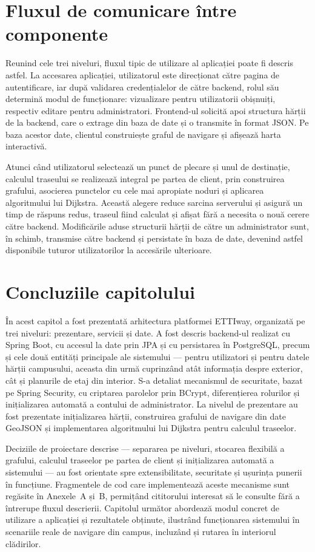 \section{Fluxul de comunicare între componente}
\label{sec:flux}

Reunind cele trei niveluri, fluxul tipic de utilizare al aplicației poate fi
descris astfel. La accesarea aplicației, utilizatorul este direcționat către
pagina de autentificare, iar după validarea credențialelor de către backend,
rolul său determină modul de funcționare: vizualizare pentru utilizatorii
obișnuiți, respectiv editare pentru administratori. Frontend-ul solicită apoi
structura hărții de la backend, care o extrage din baza de date și o
transmite în format JSON. Pe baza acestor date, clientul construiește graful
de navigare și afișează harta interactivă.

Atunci când utilizatorul selectează un punct de plecare și unul de
destinație, calculul traseului se realizează integral pe partea de client,
prin construirea grafului, asocierea punctelor cu cele mai apropiate noduri
și aplicarea algoritmului lui Dijkstra. Această alegere reduce sarcina
serverului și asigură un timp de răspuns redus, traseul fiind calculat și
afișat fără a necesita o nouă cerere către backend. Modificările aduse
structurii hărții de către un administrator sunt, în schimb, transmise către
backend și persistate în baza de date, devenind astfel disponibile tuturor
utilizatorilor la accesările ulterioare.

\section{Concluziile capitolului}
\label{sec:concluzii-cap2}

În acest capitol a fost prezentată arhitectura platformei ETTIway, organizată
pe trei niveluri: prezentare, servicii și date. A fost descris backend-ul
realizat cu Spring Boot, cu accesul la date prin JPA și cu persistarea în
PostgreSQL, precum și cele două entități principale ale sistemului — pentru
utilizatori și pentru datele hărții campusului, aceasta din urmă cuprinzând
atât informația despre exterior, cât și planurile de etaj din interior. S-a detaliat mecanismul de securitate, bazat pe Spring Security, cu
criptarea parolelor prin BCrypt, diferențierea rolurilor și inițializarea
automată a contului de administrator. La nivelul de prezentare au fost
prezentate inițializarea hărții, construirea grafului de navigare din date
GeoJSON și implementarea algoritmului lui Dijkstra pentru calculul traseelor.

Deciziile de proiectare descrise — separarea pe niveluri, stocarea flexibilă
a grafului, calculul traseelor pe partea de client și inițializarea automată
a sistemului — au fost orientate spre extensibilitate, securitate și ușurința
punerii în funcțiune. Fragmentele de cod care implementează aceste mecanisme
sunt regăsite în Anexele~A și~B, permițând cititorului interesat să le
consulte fără a întrerupe fluxul descrierii. Capitolul următor abordează
modul concret de utilizare a aplicației și rezultatele obținute, ilustrând
funcționarea sistemului în scenariile reale de navigare din campus,
incluzând și rutarea în interiorul clădirilor.
